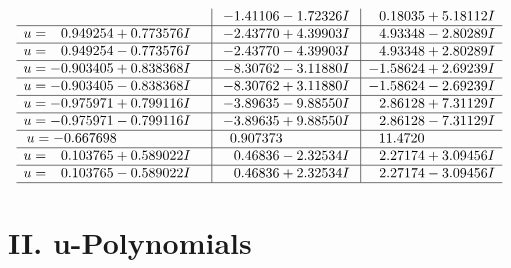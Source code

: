 \documentclass[1p]{elsarticle_modified}
\theoremstyle{definition}
\begin{document}
$$\begin{array}{c|c|c}
 & -1.41106 - 1.72326 I & \phantom{-}0.18035 + 5.18112 I \\ \hline\begin{aligned}
u &= \phantom{-}0.949254 + 0.773576 I\end{aligned}
 & -2.43770 + 4.39903 I & \phantom{-}4.93348 - 2.80289 I \\ \hline\begin{aligned}
u &= \phantom{-}0.949254 - 0.773576 I\end{aligned}
 & -2.43770 - 4.39903 I & \phantom{-}4.93348 + 2.80289 I \\ \hline\begin{aligned}
u &= -0.903405 + 0.838368 I\end{aligned}
 & -8.30762 - 3.11880 I & -1.58624 + 2.69239 I \\ \hline\begin{aligned}
u &= -0.903405 - 0.838368 I\end{aligned}
 & -8.30762 + 3.11880 I & -1.58624 - 2.69239 I \\ \hline\begin{aligned}
u &= -0.975971 + 0.799116 I\end{aligned}
 & -3.89635 - 9.88550 I & \phantom{-}2.86128 + 7.31129 I \\ \hline\begin{aligned}
u &= -0.975971 - 0.799116 I\end{aligned}
 & -3.89635 + 9.88550 I & \phantom{-}2.86128 - 7.31129 I \\ \hline\begin{aligned}
u &= -0.667698\phantom{ +0.000000I}\end{aligned}
 & \phantom{-}0.907373\phantom{ +0.000000I} & \phantom{-}11.4720\phantom{ +0.000000I} \\ \hline\begin{aligned}
u &= \phantom{-}0.103765 + 0.589022 I\end{aligned}
 & \phantom{-}0.46836 - 2.32534 I & \phantom{-}2.27174 + 3.09456 I \\ \hline\begin{aligned}
u &= \phantom{-}0.103765 - 0.589022 I\end{aligned}
 & \phantom{-}0.46836 + 2.32534 I & \phantom{-}2.27174 - 3.09456 I\\
 \hline 
 \end{array}$$\newpage
\newpage\renewcommand{\arraystretch}{1}
\centering \section*{ II. u-Polynomials}
\end{document}
